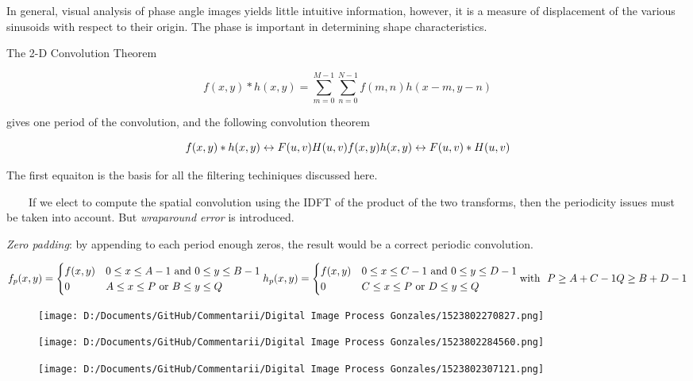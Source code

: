 \documentclass[]{article}
\begin{document}
In general, visual analysis of phase angle images yields little
intuitive information, however, it is a measure of displacement of the
various sinusoids with respect to their origin. The phase is important
in determining shape characteristics.

The 2-D Convolution Theorem

\[f(x,y)*h(x,y)=\sum\limits^{M-1}_{m=0}\sum\limits^{N-1}_{n=0}f(m,n)h(x-m,y-n)\]

gives one period of the convolution, and the following convolution
theorem

\[f(x,y)*h(x,y)\leftrightarrow F(u,v)H(u,v)\\
f(x,y)h(x,y)\leftrightarrow F(u,v)*H(u,v)\]

The first equaiton is the basis for all the filtering techiniques
discussed here.

\(\quad\quad\)If we elect to compute the spatial convolution using the
IDFT of the product of the two transforms, then the periodicity issues
must be taken into account. But \emph{wraparound error} is introduced.

\emph{Zero padding}: by appending to each period enough zeros, the
result would be a correct periodic convolution.

\[f_p(x,y)=\begin{cases}f(x,y) & 0\leq x\leq A-1 \text{ and }0\leq y\leq B-1\\
0 & A\leq x \leq P \text{ or }B\leq y \leq Q \end{cases}\\

h_p(x,y)=\begin{cases}f(x,y) & 0\leq x\leq C-1 \text{ and }0\leq y\leq D-1\\
0 & C\leq x \leq P \text{ or }D\leq y \leq Q \end{cases}\\
\text{with }\ P\geq A+C-1\\Q\geq B+D-1\]

\begin{figure}
\centering
\texttt{[image: D:/Documents/GitHub/Commentarii/Digital Image Process Gonzales/1523802270827.png]}
\caption{}
\end{figure}

\begin{figure}
\centering
\texttt{[image: D:/Documents/GitHub/Commentarii/Digital Image Process Gonzales/1523802284560.png]}
\caption{}
\end{figure}

\begin{figure}
\centering
\texttt{[image: D:/Documents/GitHub/Commentarii/Digital Image Process Gonzales/1523802307121.png]}
\caption{}
\end{figure}
\end{document}
